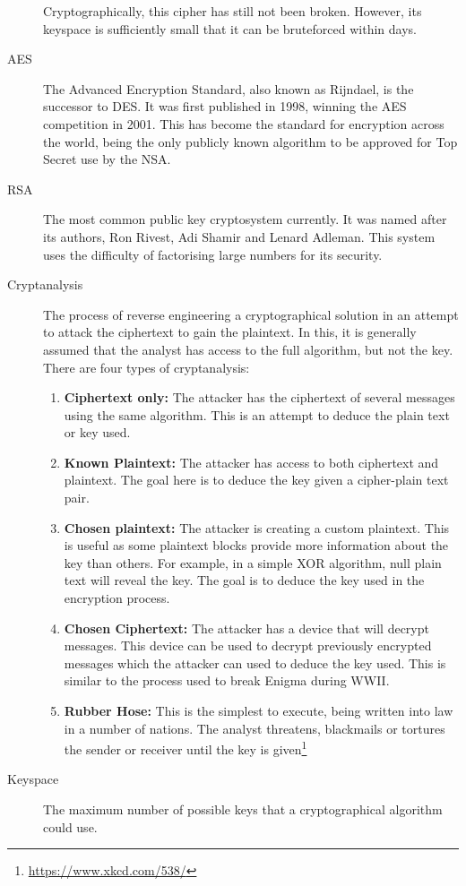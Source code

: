 \begin{description}
					Cryptographically, this cipher has still not been broken.
					However, its keyspace is sufficiently small that it can be bruteforced within days.
				\item[AES] The Advanced Encryption Standard, also known as Rijndael, is the successor to DES.
					It was first published in 1998, winning the AES competition in 2001.
					This has become the standard for encryption across the world, being the only publicly known algorithm to be approved for Top Secret use by the NSA.
				\item[RSA] The most common public key cryptosystem currently.
					It was named after its authors, Ron Rivest, Adi Shamir and Lenard Adleman.
					This system uses the difficulty of factorising large numbers for its security.
				\item[Cryptanalysis] The process of reverse engineering a cryptographical solution in an attempt to attack the ciphertext to gain the plaintext.
					In this, it is generally assumed that the analyst has access to the full algorithm, but not the key.
					There are four types of cryptanalysis:
					\begin{enumerate}
						\item \textbf{Ciphertext only:} The attacker has the ciphertext of several messages using the same algorithm.
							This is an attempt to deduce the plain text or key used.
						\item \textbf{Known Plaintext:} The attacker has access to both ciphertext and plaintext.
							The goal here is to deduce the key given a cipher-plain text pair.
						\item \textbf{Chosen plaintext:} The attacker is creating a custom plaintext.
							This is useful as some plaintext blocks provide more information about the key than others.
							For example, in a simple XOR algorithm, null plain text will reveal the key.
							The goal is to deduce the key used in the encryption process.
						\item \textbf{Chosen Ciphertext:} The attacker has a device that will decrypt messages.
							This device can be used to decrypt previously encrypted messages which the attacker can used to deduce the key used.
							This is similar to the process used to break Enigma during WWII.
						\item \textbf{Rubber Hose:} This is the simplest to execute, being written into law in a number of nations.
							The analyst threatens, blackmails or tortures the sender or receiver until the key is given\footnote{\url{https://www.xkcd.com/538/}}
					\end{enumerate}
				\item[Keyspace] The maximum number of possible keys that a cryptographical algorithm could use.
			\end{description}
